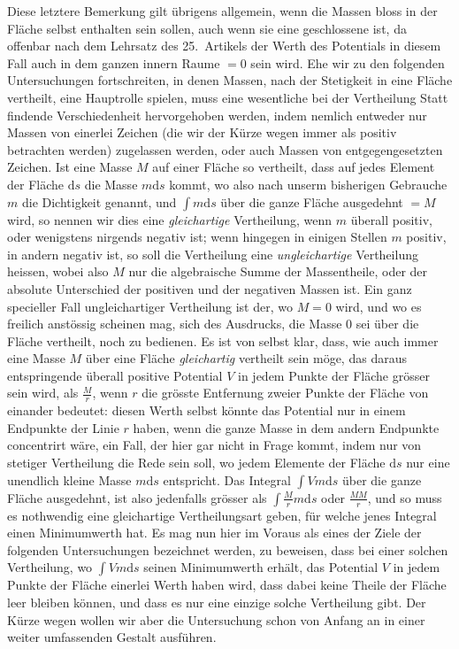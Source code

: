 Diese letztere Bemerkung gilt übrigens allgemein, wenn die Massen bloss in der Fläche selbst enthalten sein sollen, auch wenn sie eine geschlossene ist, da offenbar nach dem Lehrsatz des 25.\ Artikels der Werth des Potentials in diesem Fall auch in dem ganzen innern Raume $=0$ sein wird.
Ehe wir zu den folgenden Untersuchungen fortschreiten, in denen Massen, nach der Stetigkeit in eine Fläche vertheilt, eine Hauptrolle spielen, muss eine wesentliche bei der Vertheilung Statt findende Verschiedenheit hervorgehoben werden, indem nemlich entweder nur Massen von einerlei Zeichen (die wir der Kürze wegen immer als positiv betrachten werden) zugelassen werden, oder auch Massen von entgegengesetzten Zeichen. Ist eine Masse $M$ auf einer Fläche so vertheilt, dass auf jedes Element der Fläche $\mathrm ds$ die Masse $m\mathrm ds$ kommt, wo also nach unserm bisherigen Gebrauche $m$ die Dichtigkeit genannt, und $\int m\mathrm ds$ über die ganze Fläche ausgedehnt $=M$ wird, so nennen wir dies eine \textit{gleichartige} Vertheilung, wenn $m$ überall positiv, oder wenigstens nirgends negativ ist; wenn hingegen in einigen Stellen $m$ positiv, in andern negativ ist, so soll die Vertheilung eine \textit{ungleichartige} Vertheilung heissen, wobei also $M$ nur die algebraische Summe der Massentheile, oder der absolute Unterschied der positiven und der negativen Massen ist. Ein ganz specieller Fall ungleichartiger Vertheilung ist der, wo $M=0$ wird, und wo es freilich anstössig scheinen mag, sich des Ausdrucks, die Masse $0$ sei über die Fläche vertheilt, noch zu bedienen.
Es ist von selbst klar, dass, wie auch immer eine Masse $M$ über eine Fläche \textit{gleichartig} vertheilt sein möge, das daraus entspringende überall positive Potential $V$ in jedem Punkte der Fläche grösser sein wird, als $\frac{M}{r}$, wenn $r$ die grösste Entfernung zweier Punkte der Fläche von einander bedeutet: diesen Werth selbst könnte das Potential nur in einem Endpunkte der Linie $r$ haben, wenn die ganze Masse in dem andern Endpunkte concentrirt wäre, ein Fall, der hier gar nicht in Frage kommt, indem nur von stetiger Vertheilung die Rede sein soll, wo jedem Elemente der Fläche $\mathrm ds$ nur eine unendlich kleine Masse $m\mathrm ds$ entspricht. Das Integral $\int Vm\mathrm ds$ über die ganze Fläche ausgedehnt, ist also jedenfalls grösser als $\int\frac{M}{r}m\mathrm ds$ oder $\frac{MM}{r}$, und so muss es nothwendig eine gleichartige Vertheilungsart geben, für welche jenes Integral einen Minimumwerth hat. Es mag nun hier im Voraus als eines der Ziele der folgenden Untersuchungen bezeichnet werden, zu beweisen, dass bei einer solchen Vertheilung, wo $\int Vm\mathrm ds$ seinen Minimumwerth erhält, das Potential $V$ in jedem Punkte der Fläche einerlei Werth haben wird, dass dabei keine Theile der Fläche leer bleiben können, und dass es nur eine einzige solche Vertheilung gibt. Der Kürze wegen wollen wir aber die Untersuchung schon von Anfang an in einer weiter umfassenden Gestalt ausführen.
